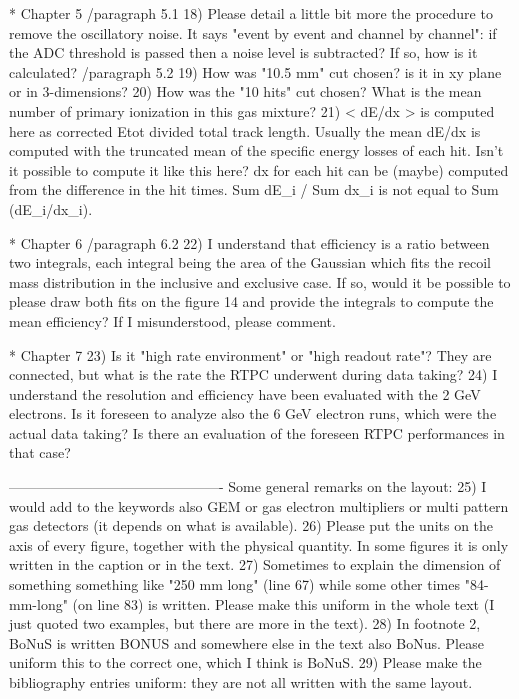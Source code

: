 \documentclass[a4paper,11pt,twoside]{article}
\begin{document}
* Chapter 5
	/paragraph 5.1	
18)	Please detail a little bit more the procedure to remove the oscillatory noise. It says "event by event and channel by channel": if the ADC threshold is passed then a noise level is subtracted? If so, how is it calculated?
        /paragraph 5.2
19)	How was "10.5 mm" cut chosen? is it in xy plane or in 3-dimensions?
20)	How was the "10 hits" cut chosen? What is the mean number of primary ionization in this gas mixture?
21)	< dE/dx > is computed here as corrected Etot divided total track length. Usually the mean dE/dx is computed with the truncated mean of the specific energy losses of each hit. Isn't it possible to compute it like this here? dx for each hit can be (maybe) computed from the difference in the hit times. Sum dE_i / Sum dx_i is not equal to Sum (dE_i/dx_i).

* Chapter 6
	/paragraph 6.2
22)	I understand that efficiency is a ratio between two integrals, each integral being the area of the Gaussian which fits the recoil mass distribution in the inclusive and exclusive case. If so, would it be possible to please draw both fits on the figure 14 and provide the integrals to compute the mean efficiency? If I misunderstood, please comment.

* Chapter 7 
23)	Is it "high rate environment" or "high readout rate"? They are connected, but what is the rate the RTPC underwent during data taking?
24)	I understand the resolution and efficiency have been evaluated with the 2 GeV electrons. Is it foreseen to analyze also the 6 GeV electron runs, which were the actual data taking? Is there an evaluation of the foreseen RTPC performances in that case?

----------------------------------------------
Some general remarks on the layout:
25)	I would add to the keywords also GEM or gas electron multipliers or multi pattern gas detectors (it depends on what is available).
26)	Please put the units on the axis of every figure, together with the physical quantity. In some figures it is only written in the caption or in the text.
27)	Sometimes to explain the dimension of something something like "250 mm long" (line 67) while some other times "84-mm-long" (on line 83) is written. Please make this uniform in the whole text (I just quoted two examples, but there are more in the text).
28)	In footnote 2, BoNuS is written BONUS and somewhere else in the text also BoNus. Please uniform this to the correct one, which I think is BoNuS.
29)	Please make the bibliography entries uniform: they are not all written with the same layout.
\end{document}
